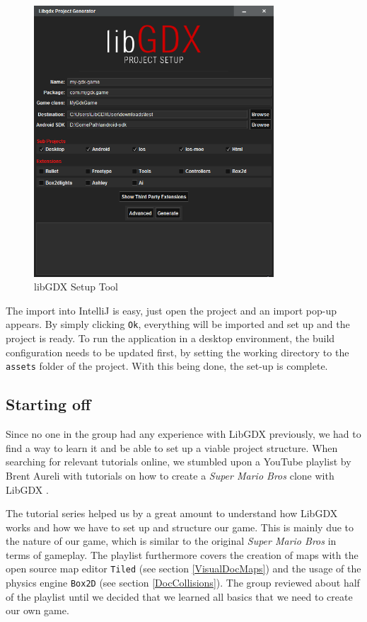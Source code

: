 \documentclass[12p]{article}
\begin{document}
\begin{figure}[ht]
  \centering
  \includegraphics[width=0.8\textwidth]{libGDX_setup.png}
  \caption{libGDX Setup Tool}
  \label{fig:LibGDXSetupScreenshot}
\end{figure}

The import into IntelliJ is easy, just open the project and an import pop-up appears. By simply clicking \texttt{Ok}, everything will be imported and set up and the project is ready. To run the application in a desktop environment, the build configuration needs to be updated first, by setting the working directory to the \texttt{assets} folder of the project. With this being done, the set-up is complete.


\newpage
\subsection{Starting off}

Since no one in the group had any experience with LibGDX previously, we had to find a way to learn it and be able to set up a viable project structure. When searching for relevant tutorials online, we stumbled upon a YouTube playlist by Brent Aureli with tutorials on how to create a \emph{Super Mario Bros} \cite{SuperMarioBros} clone with LibGDX \cite{BrentAureliSuperMarioBros}.

The tutorial series helped us by a great amount to understand how LibGDX works and how we have to set up and structure our game. This is mainly due to the nature of our game, which is similar to the original \emph{Super Mario Bros} in terms of gameplay. The playlist furthermore covers the creation of maps with the open source map editor \texttt{Tiled} (see section \ref{VisualDocMaps}) and the usage of the physics engine \texttt{Box2D} (see section \ref{DocCollisions}). The group reviewed about half of the playlist until we decided that we learned all basics that we need to create our own game.
\end{document}
